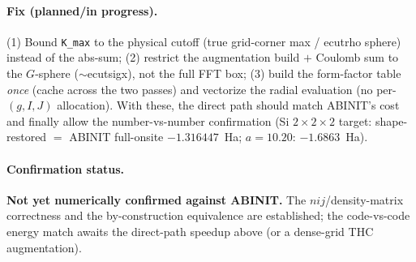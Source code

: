 \documentclass[11pt]{article}
\newcommand{\code}[1]{\texttt{\small #1}}
\begin{document}
\paragraph{Fix (planned/in progress).}
(1) Bound \code{K\_max} to the physical cutoff (true grid-corner max / ecutrho
sphere) instead of the abs-sum; (2) restrict the augmentation build $+$ Coulomb sum
to the $G$-sphere ($\sim$ecutsigx), not the full FFT box; (3) build the form-factor
table \emph{once} (cache across the two passes) and vectorize the radial evaluation
(no per-$(g,I,J)$ allocation). With these, the direct path should match ABINIT's cost
and finally allow the number-vs-number confirmation
(Si $2\times2\times2$ target: shape-restored $=$ ABINIT full-onsite $-1.316447$~Ha;
$a=10.20$: $-1.6863$~Ha).

\paragraph{Confirmation status.} \textbf{Not yet numerically confirmed against
ABINIT.} The $nij$/density-matrix correctness and the by-construction equivalence are
established; the code-vs-code energy match awaits the direct-path speedup above (or a
dense-grid THC augmentation).
\end{document}
